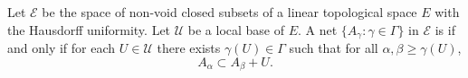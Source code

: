 Let $\mathcal{E}$ be the space of non-void closed subsets of a linear topological space $E$ with the Hausdorff uniformity. Let $\mathcal{U}$ be a local base of $E$. A net $\{A_\gamma: \gamma \in \Gamma\}$ in $\mathcal{E}$ is  if and only if for each $U \in \mathcal{U}$ there exists $\gamma(U) \in \Gamma$ such that for all $\alpha, \beta \geq \gamma(U)$,
$$A_\alpha \subset A_\beta + U.$$
